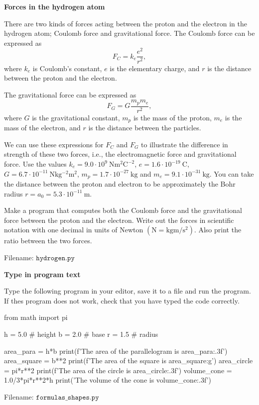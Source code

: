 \begin{Problem}{\textbf{Forces in the hydrogen atom}}\label{prob15}

\noindent There are two kinds of forces acting between the proton and the electron in the
hydrogen atom; Coulomb force and gravitational force. The Coulomb force can be
expressed as
\begin{equation*}
F_C = k_e \frac{e^2}{r^2},
\end{equation*}
where $k_e$ is Coulomb's constant, $e$ is the elementary charge, and $r$ is the
distance between the proton and the electron.

The gravitational force can be expressed as
\begin{equation*}
F_G = G\frac{m_pm_e}{r^2},
\end{equation*}
where $G$ is the gravitational constant, $m_p$ is the mass of the proton, $m_e$
is the mass of the electron, and $r$ is the distance between the particles.

We can use these expressions for $F_C$ and $F_G$ to illustrate the difference in
strength of these two forces, i.e., the electromagnetic force and gravitational force.
Use the values
$k_e = 9.0\cdot 10^9 \ \mathrm{Nm^2C^{-2}}$,
$e = 1.6\cdot 10^{-19} \ \mathrm{C}$, $G = 6.7\cdot 10^{-11} \ \mathrm{Nkg^{-2}m^2}$,
$m_p = 1.7\cdot 10^{-27} \ \mathrm{kg}$ and $m_e = 9.1 \cdot 10^{-31} \ \mathrm{kg}$.
You can take the distance between the proton and electron to be approximately
the Bohr radius $r = a_0 = 5.3\cdot 10^{-11} \ \mathrm{m}$.

Make a program that computes both the Coulomb force and the gravitational force
between the proton and the electron. Write out the forces in scientific notation
with one decimal in units of Newton $(\mathrm{N = kg m/s^2})$. Also print the
ratio between the two forces.

Filename: $\texttt{hydrogen.py}$
\end{Problem}

\begin{Problem}{\textbf{Type in program text}}\label{formulas_shapes}

\noindent Type the following program in your editor, save it to a file
 and run the program. If thes program does
not work, check that you have typed the code correctly.
\begin{python}
from math import pi

h = 5.0 # height
b = 2.0 # base
r = 1.5 # radius

area_para = h*b
print(f'The area of the parallelogram is {area_para:.3f}')
area_square = b**2
print(f'The area of the square is {area_square:g}')
area_circle = pi*r**2
print(f'The area of the circle is {area_circle:.3f}')
volume_cone = 1.0/3*pi*r**2*h
print('The volume of the cone is {volume_cone:.3f}')
\end{python}

Filename: $\texttt{formulas\_shapes.py}$
\end{Problem}

